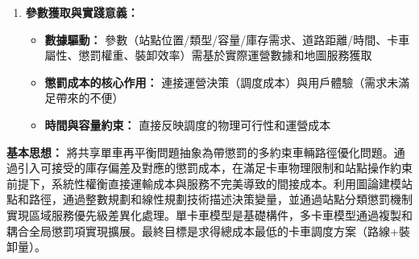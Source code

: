 \begin{enumerate}
    \item \textbf{參數獲取與實踐意義：}
    \begin{itemize}
        \item \textbf{數據驅動：} 參數（站點位置/類型/容量/庫存需求、道路距離/時間、卡車屬性、懲罰權重、裝卸效率）需基於實際運營數據和地圖服務獲取
        \item \textbf{懲罰成本的核心作用：} 連接運營決策（調度成本）與用戶體驗（需求未滿足帶來的不便）
        \item \textbf{時間與容量約束：} 直接反映調度的物理可行性和運營成本
    \end{itemize}
\end{enumerate}

\textbf{基本思想：} 將共享單車再平衡問題抽象為帶懲罰的多約束車輛路徑優化問題。通過引入可接受的庫存偏差及對應的懲罰成本，在滿足卡車物理限制和站點操作約束前提下，系統性權衡直接運輸成本與服務不完美導致的間接成本。利用圖論建模站點和路徑，通過整數規劃和線性規劃技術描述決策變量，並通過站點分類懲罰機制實現區域服務優先級差異化處理。單卡車模型是基礎構件，多卡車模型通過複製和耦合全局懲罰項實現擴展。最終目標是求得總成本最低的卡車調度方案（路線+裝卸量）。